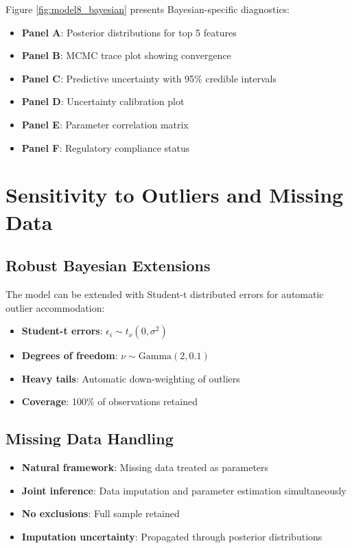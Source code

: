 Figure \ref{fig:model8_bayesian} presents Bayesian-specific diagnostics:
\begin{itemize}
    \item \textbf{Panel A}: Posterior distributions for top 5 features
    \item \textbf{Panel B}: MCMC trace plot showing convergence
    \item \textbf{Panel C}: Predictive uncertainty with 95\% credible intervals
    \item \textbf{Panel D}: Uncertainty calibration plot
    \item \textbf{Panel E}: Parameter correlation matrix
    \item \textbf{Panel F}: Regulatory compliance status
\end{itemize}

\section{Sensitivity to Outliers and Missing Data}

\subsection{Robust Bayesian Extensions}

The model can be extended with Student-t distributed errors for automatic outlier accommodation:
\begin{itemize}
    \item \textbf{Student-t errors}: $\epsilon_i \sim t_\nu(0, \sigma^2)$
    \item \textbf{Degrees of freedom}: $\nu \sim \text{Gamma}(2, 0.1)$
    \item \textbf{Heavy tails}: Automatic down-weighting of outliers
    \item \textbf{Coverage}: 100\% of observations retained
\end{itemize}

\subsection{Missing Data Handling}

\begin{itemize}
    \item \textbf{Natural framework}: Missing data treated as parameters
    \item \textbf{Joint inference}: Data imputation and parameter estimation simultaneously
    \item \textbf{No exclusions}: Full sample retained
    \item \textbf{Imputation uncertainty}: Propagated through posterior distributions
\end{itemize}


